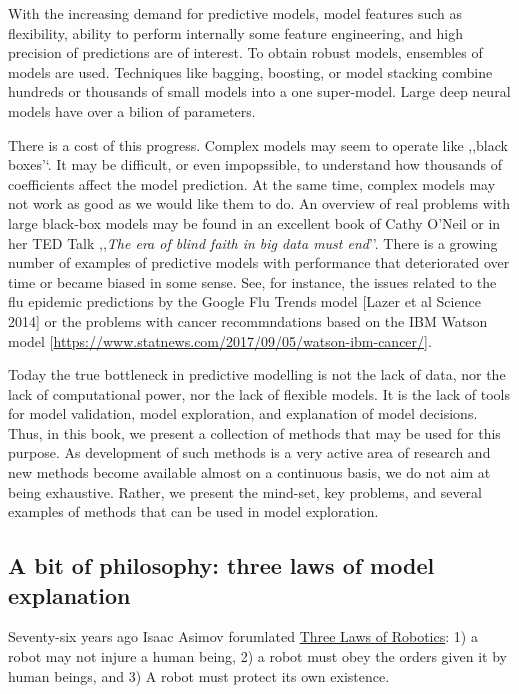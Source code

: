\documentclass[]{krantz}
\theoremstyle{definition}
\theoremstyle{definition}
\theoremstyle{definition}
\theoremstyle{remark}
\begin{document}
With the increasing demand for predictive models, model features such as
flexibility, ability to perform internally some feature engineering, and
high precision of predictions are of interest. To obtain robust models,
ensembles of models are used. Techniques like bagging, boosting, or
model stacking combine hundreds or thousands of small models into a one
super-model. Large deep neural models have over a bilion of parameters.

There is a cost of this progress. Complex models may seem to operate
like ,,black boxes'`. It may be difficult, or even impopssible, to
understand how thousands of coefficients affect the model prediction. At
the same time, complex models may not work as good as we would like them
to do. An overview of real problems with large black-box models may be
found in an excellent book of Cathy O'Neil \citep{ONeil} or in her TED
Talk ,,\emph{The era of blind faith in big data must end}''. There is a
growing number of examples of predictive models with performance that
deteriorated over time or became biased in some sense. See, for
instance, the issues related to the flu epidemic predictions by the
Google Flu Trends model {[}Lazer et al Science 2014{]} or the problems
with cancer recommndations based on the IBM Watson model
{[}\url{https://www.statnews.com/2017/09/05/watson-ibm-cancer/}{]}.

Today the true bottleneck in predictive modelling is not the lack of
data, nor the lack of computational power, nor the lack of flexible
models. It is the lack of tools for model validation, model exploration,
and explanation of model decisions. Thus, in this book, we present a
collection of methods that may be used for this purpose. As development
of such methods is a very active area of research and new methods become
available almost on a continuous basis, we do not aim at being
exhaustive. Rather, we present the mind-set, key problems, and several
examples of methods that can be used in model exploration.

\hypertarget{three-single-laws}{%
\subsection{A bit of philosophy: three laws of model
explanation}\label{three-single-laws}}

Seventy-six years ago Isaac Asimov forumlated
\href{https://en.wikipedia.org/wiki/Three_Laws_of_Robotics}{Three Laws
of Robotics}: 1) a robot may not injure a human being, 2) a robot must
obey the orders given it by human beings, and 3) A robot must protect
its own existence.
\end{document}
